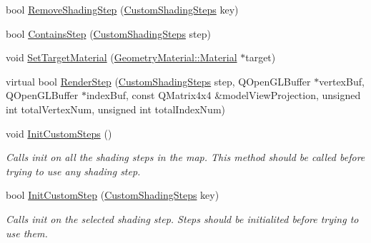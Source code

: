 \begin{DoxyCompactItemize}
\item 
bool \mbox{\hyperlink{class_geometry_engine_1_1_custom_shading_1_1_custom_shading_interface_ae5f0bbc37cd6333fd389acabb2723c34}{Remove\+Shading\+Step}} (\mbox{\hyperlink{namespace_geometry_engine_1_1_custom_shading_a2dc236a5b567da5099069ce2b2be5609}{Custom\+Shading\+Steps}} key)
\item 
bool \mbox{\hyperlink{class_geometry_engine_1_1_custom_shading_1_1_custom_shading_interface_a3702af941a05a692b3e9c8f9597a0f76}{Contains\+Step}} (\mbox{\hyperlink{namespace_geometry_engine_1_1_custom_shading_a2dc236a5b567da5099069ce2b2be5609}{Custom\+Shading\+Steps}} step)
\item 
void \mbox{\hyperlink{class_geometry_engine_1_1_custom_shading_1_1_custom_shading_interface_af4985887a7c390af80fed9dc55a42e58}{Set\+Target\+Material}} (\mbox{\hyperlink{class_geometry_engine_1_1_geometry_material_1_1_material}{Geometry\+Material\+::\+Material}} $\ast$target)
\item 
virtual bool \mbox{\hyperlink{class_geometry_engine_1_1_custom_shading_1_1_custom_shading_interface_a78a7ebc766069eb80ee641b5765445dd}{Render\+Step}} (\mbox{\hyperlink{namespace_geometry_engine_1_1_custom_shading_a2dc236a5b567da5099069ce2b2be5609}{Custom\+Shading\+Steps}} step, Q\+Open\+G\+L\+Buffer $\ast$vertex\+Buf, Q\+Open\+G\+L\+Buffer $\ast$index\+Buf, const Q\+Matrix4x4 \&model\+View\+Projection, unsigned int total\+Vertex\+Num, unsigned int total\+Index\+Num)
\item 
\mbox{\label{class_geometry_engine_1_1_custom_shading_1_1_custom_shading_interface_a33f156385620cc991853573bbb8cb1a0}} 
void \mbox{\hyperlink{class_geometry_engine_1_1_custom_shading_1_1_custom_shading_interface_a33f156385620cc991853573bbb8cb1a0}{Init\+Custom\+Steps}} ()
\begin{DoxyCompactList}\small\item\em Calls init on all the shading steps in the map. This method should be called before trying to use any shading step. \end{DoxyCompactList}\item 
\mbox{\label{class_geometry_engine_1_1_custom_shading_1_1_custom_shading_interface_aff189b50a22650a19eba44b96eb62b1f}} 
bool \mbox{\hyperlink{class_geometry_engine_1_1_custom_shading_1_1_custom_shading_interface_aff189b50a22650a19eba44b96eb62b1f}{Init\+Custom\+Step}} (\mbox{\hyperlink{namespace_geometry_engine_1_1_custom_shading_a2dc236a5b567da5099069ce2b2be5609}{Custom\+Shading\+Steps}} key)
\begin{DoxyCompactList}\small\item\em Calls init on the selected shading step. Steps should be initialited before trying to use them. \end{DoxyCompactList}\end{DoxyCompactItemize}

